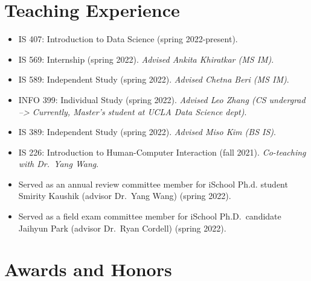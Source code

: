 \documentclass[11pt,a4paper,]{awesome-cv}
\begin{document}
\section{Teaching Experience}\label{teaching-experience}

\begin{itemize}
\item
  IS 407: Introduction to Data Science (spring 2022-present).
\item
  IS 569: Internship (spring 2022). \emph{Advised Ankita Khiratkar (MS
  IM)}.
\item
  IS 589: Independent Study (spring 2022). \emph{Advised Chetna Beri (MS
  IM)}.
\item
  INFO 399: Individual Study (spring 2022). \emph{Advised Leo Zhang (CS
  undergrad --\textgreater{} Currently, Master's student at UCLA Data
  Science dept)}.
\item
  IS 389: Independent Study (spring 2022). \emph{Advised Miso Kim (BS
  IS)}.
\item
  IS 226: Introduction to Human-Computer Interaction (fall 2021).
  \emph{Co-teaching with Dr.~Yang Wang}.
\item
  Served as an annual review committee member for iSchool Ph.d. student
  Smirity Kaushik (advisor Dr.~Yang Wang) (spring 2022).
\item
  Served as a field exam committee member for iSchool Ph.D.~candidate
  Jaihyun Park (advisor Dr.~Ryan Cordell) (spring 2022).
\end{itemize}

\section{Awards and Honors}\label{awards-and-honors}
\end{document}
